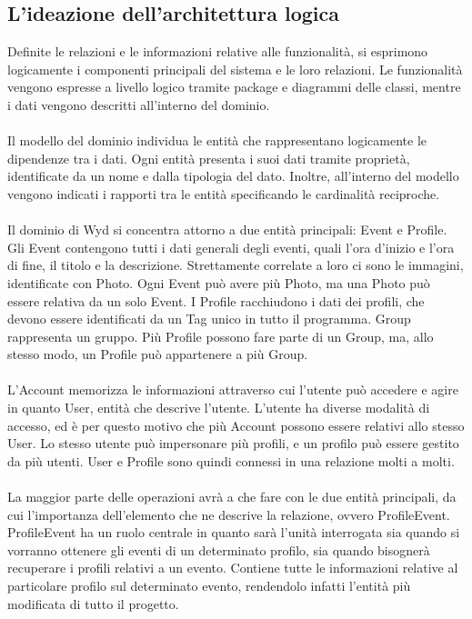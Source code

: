 \subsection{L'ideazione dell'architettura logica}


Definite le relazioni e le informazioni relative alle funzionalità,
si esprimono logicamente i componenti principali del sistema e le loro relazioni.
Le funzionalità vengono espresse a livello logico tramite package e diagrammi delle classi, 
mentre i dati vengono descritti all'interno del dominio. \\
\\
Il modello del dominio individua le entità che rappresentano logicamente le dipendenze tra i dati.
Ogni entità presenta i suoi dati tramite proprietà, 
identificate da un nome e dalla tipologia del dato.
Inoltre, all'interno del modello vengono indicati i rapporti tra le entità specificando le cardinalità reciproche.\\
\\
Il dominio di Wyd si concentra attorno a due entità principali: Event e Profile.\\
Gli Event contengono tutti i dati generali degli eventi,
quali l'ora d'inizio e l'ora di fine, il titolo e la descrizione.
Strettamente correlate a loro ci sono le immagini, identificate con Photo.
Ogni Event può avere più Photo, ma una Photo può essere relativa da un solo Event.
I Profile racchiudono i dati dei profili, che devono essere identificati da un Tag unico in tutto il programma.
Group rappresenta un gruppo.
Più Profile possono fare parte di un Group, ma, allo stesso modo, un Profile può appartenere a più Group.\\
\\
L'Account memorizza le informazioni attraverso cui l'utente può accedere e 
agire in quanto User, entità che descrive l'utente. 
L'utente ha diverse modalità di accesso, 
ed è per questo motivo che più Account possono essere relativi allo stesso User.
Lo stesso utente può impersonare più profili,
e un profilo può essere gestito da più utenti.
User e Profile sono quindi connessi in una relazione molti a molti.\\
\\
La maggior parte delle operazioni avrà a che fare con le due entità principali, 
da cui l'importanza dell'elemento che ne descrive la relazione, ovvero ProfileEvent.\\
ProfileEvent ha un ruolo centrale in quanto sarà l'unità interrogata 
sia quando si vorranno ottenere gli eventi di un determinato profilo,
sia quando bisognerà recuperare i profili relativi a un evento. 
Contiene tutte le informazioni relative al particolare profilo sul determinato evento,
rendendolo infatti l'entità più modificata di tutto il progetto.\\
\\

